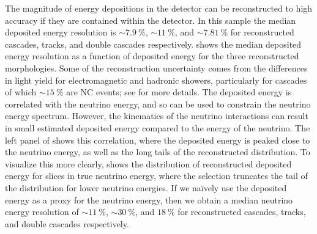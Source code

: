 The magnitude of energy depositions in the detector can be reconstructed to high accuracy if they are contained within the detector.
In this sample the median deposited energy resolution is $\sim\SI{7.9}\percent$, $\sim\SI{11}\percent$, and $\sim\SI{7.81}\percent$ for reconstructed cascades, tracks, and double cascades respectively.
 shows the median deposited energy resolution as a function of deposited energy for the three reconstructed morphologies.
Some of the reconstruction uncertainty comes from the differences in light yield for electromagnetic and hadronic showers, particularly for cascades of which $\sim\SI{15}\percent$ are NC events; see  for more details.
The deposited energy is correlated with the neutrino energy, and so can be used to constrain the neutrino energy spectrum.
However, the kinematics of the neutrino interactions can result in small estimated deposited energy compared to the energy of the neutrino.
The left panel of  shows this correlation, where the deposited energy is peaked close to the neutrino energy, as well as the long tails of the reconstructed distribution.
To visualize this more clearly,  shows the distribution of reconstructed deposited energy for slices in true neutrino energy, where the selection truncates the tail of the distribution for lower neutrino energies.
If we na\"ively use the deposited energy as a proxy for the neutrino energy, then we obtain a median neutrino energy resolution of $\sim\SI{11}\percent$, $\sim\SI{30}\percent$, and $\SI{18}\percent$ for reconstructed cascades, tracks, and double cascades respectively.

